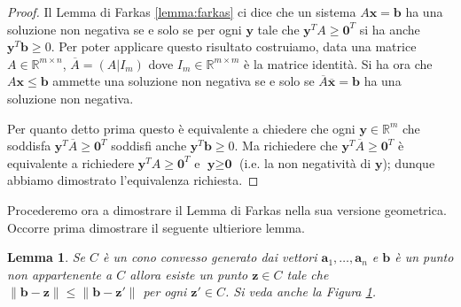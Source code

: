 \documentclass[italian, letter paper, 12pt, reqno]{article}
\theoremstyle{myteo}
\newtheorem{lemma}[theorem]{Lemma}
\numberwithin{equation}{section}
\begin{document}
\begin{proof}
  Il Lemma di Farkas \ref{lemma:farkas} ci dice che un sistema \(A \textbf{x}= \textbf{b}\) ha una soluzione non negativa se e solo se per ogni \(\textbf{y}\) tale che \(\textbf{y}^TA \geq \textbf{0}^T\) si ha anche \(\textbf{y}^T \textbf{b} \geq 0\).
  Per poter applicare questo risultato costruiamo, data una matrice \(A\in \mathbb{R}^{m\times n}\), \(\overline{A}= (A|I_m)\) dove \(I_m\in \mathbb{R}^{m\times m}\) è la matrice identità.
  Si ha ora che \(A \textbf{x} \leq \textbf{b}\) ammette una soluzione non negativa se e solo se \(\overline{A} \mathbf{\overline{x}} = \textbf{b}\) ha una soluzione non negativa.

  Per quanto detto prima questo è equivalente a chiedere che ogni \(\textbf{y}\in \mathbb{R}^m\) che soddisfa \(\mathbf{y}^T\overline{A} \geq \textbf{0}^T\) soddisfi anche \(\mathbf{y}^T \textbf{b} \geq 0\).
  Ma richiedere che \(\textbf{y}^T\overline{A} \geq \textbf{0}^T\) è equivalente a richiedere \(\textbf{y}^TA \geq \textbf{0}^T\) e \(\textbf{y} \geq \textbf{0}\) (i.e. la non negatività di \(\textbf{y}\)); dunque abbiamo dimostrato l'equivalenza richiesta.
\end{proof}

Procederemo ora a dimostrare il Lemma di Farkas nella sua versione geometrica.
Occorre prima dimostrare il seguente ultieriore lemma.

\begin{lemma}
  \label{lemma:punto_vicino}
  Se \(C\) è un cono convesso generato dai vettori \(\mathbf{a}_1,\ldots,\mathbf{a}_n\) e \(\mathbf{b}\) è un punto non appartenente a \(C\) allora esiste un punto \(\mathbf{z}\in C\) tale che \(\|\mathbf{b} - \mathbf{z}\| \le \|\mathbf{b} - \mathbf{z}'\|\) per ogni \(\mathbf{z}'\in C\).
  Si veda anche la Figura \ref{fig:punto_vicino}.
\end{lemma}

\begin{figure}[h]
  \begin{center}
    \hspace{1cm}
  \end{center}
  \caption{}
  \label{fig:punto_vicino}
\end{figure}
\end{document}
